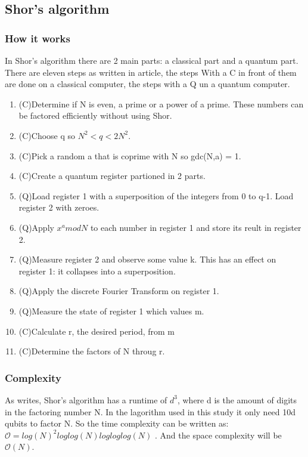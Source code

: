 \begin{table}[]
\begin{tabular}{|l|l|l|l|l|l|l|}
    \end{tabular}
\end{table}

\subsection{Shor's algorithm}
\subsubsection{How it works}
In Shor's algorithm there are 2 main parts: a classical part and a quantum part.
There are eleven steps as written in \textcite{shor_step} article, the steps With a C in front of them are done on a classical computer, the steps with a Q un a quantum computer.
\begin{enumerate}
    \item (C)Determine if N is even, a prime or a power of a prime. These numbers can be factored efficiently without using Shor. 
    \item (C)Choose q so $N^2<q<2N^2$.
    \item (C)Pick a random a that is coprime with N so gdc(N,a) = 1.
    \item (C)Create a quantum register partioned in 2 parts.
    \item (Q)Load register 1 with a superposition of the integers from 0 to q-1. Load register 2 with zeroes.
    \item (Q)Apply $x^a mod N$ to each number in register 1 and store its reult in register 2.
    \item (Q)Measure register 2 and observe some value k. This has an effect on register 1: it collapses into a superposition.
    \item (Q)Apply the discrete Fourier Transform on register 1.
    \item (Q)Measure the state of register 1 which values m.
    \item (C)Calculate r, the desired period, from m
    \item (C)Determine the factors of N throug r.

\end{enumerate}
\subsubsection{Complexity}
As \textcite{shor_algo} writes, Shor's algorithm has a runtime of $d^3$, where d is the amount of digits in the factoring number N. In the lagorithm used in this study it only need 10d qubits to factor N.
So the time complexity can be written as: $\mathcal{O} = log(N)^2log log(N) log log log(N)$ \autocite{shor_comp}. And the space complexity will be $\mathcal{O}(N)$.
